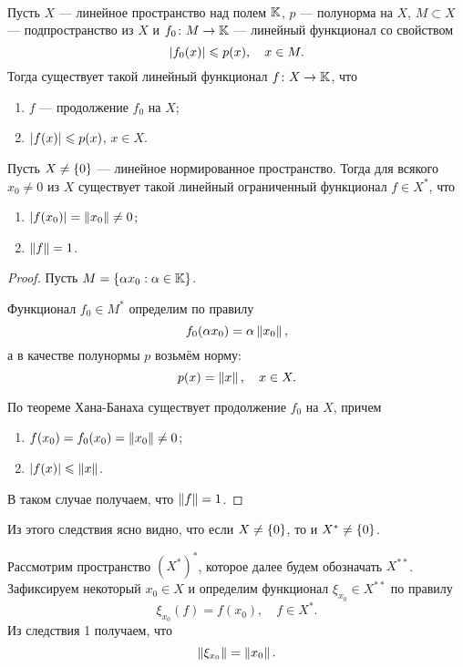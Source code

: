 \begin{theorem}\hfill\\
    \indent Пусть $X$ --- линейное пространство над полем $\mathbb{K}$, $p$ --- полунорма на $X$,
    $M \subset X$ --- подпространство из $X$ и $f_0 \colon M \to \mathbb{K}$ --- линейный
    функционал со свойством
    \[ \left|f_0(x)\right| \leqslant p(x), \quad x \in M. \]
    Тогда существует такой линейный функционал $f \colon X \to \mathbb{K}$, что
    \begin{enumerate}
        \item $f$ --- продолжение $f_0$ на $X$;
        \item $\left|f(x)\right| \leqslant p(x)$, $x \in X$.
    \end{enumerate}
\end{theorem}

\begin{corollaryth}
    Пусть $X \neq \left\{0\right\}$ --- линейное нормированное пространство. 
    Тогда для всякого $x_0 \neq 0$ из $X$
    существует такой линейный ограниченный функционал $f \in X^*$, что
    \begin{enumerate}
        \item $\left|f(x_0)\right| = \left\|x_0\right\| \neq 0$;
        \item $\left\|f\right\| = 1$.
    \end{enumerate}
\end{corollaryth}

\begin{proof}
    Пусть $M = \left\{\alpha x_0 : \alpha \in \mathbb{K}\right\}$. 

    Функционал $f_0 \in M^*$ определим
    по правилу
    \[ f_0(\alpha x_0) = \alpha \left\|x_0\right\|, \]
    а в качестве полунормы $p$ возьмём норму:
    \[ p(x) = \left\|x\right\|, \quad x \in X. \]

    По теореме Хана-Банаха существует продолжение $f_0$ на $X$, причем
    \begin{enumerate}
        \item $f(x_0) = f_0(x_0) = \left\|x_0\right\| \neq 0$;
        \item $\left|f(x)\right| \leqslant \left\|x\right\|$.
    \end{enumerate}

    В таком случае получаем, что $\left\|f\right\| = 1$.
\end{proof}

Из этого следствия ясно видно, что если $X \neq \left\{0\right\}$, то и $X^* \neq \left\{0\right\}$.

Рассмотрим пространство $(X^*)^*$, которое далее будем обозначать $X^{**}$. 
Зафиксируем некоторый $x_0 \in X$ и определим функционал
$\xi_{x_0} \in X^{**}$ по правилу
\begin{equation}\label{eq:functional}
    \xi_{x_0}(f) = f(x_0), \quad f \in X^*.
\end{equation}
Из следствия 1 получаем, что
\[ \left\|\xi_{x_0}\right\| = \left\|x_0\right\|. \]


